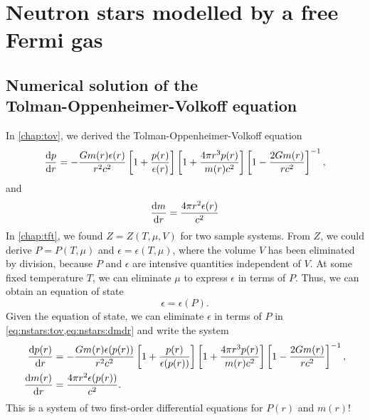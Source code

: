 \chapter{Neutron stars modelled by a free Fermi gas}


\section{Numerical solution of the \texorpdfstring{\\}{}Tolman-Oppenheimer-Volkoff equation}

In \cref{chap:tov}, we derived the Tolman-Oppenheimer-Volkoff equation
\begin{equation}
	\odv{p}{r} = -\frac{G m(r) \epsilon(r)}{r^2 c^2} \left[ 1 + \frac{p(r)}{\epsilon(r)} \right] \left[ 1 + \frac{4 \pi r^3 p(r)}{m(r) c^2} \right] \left[ 1 - \frac{2 G m(r)}{r c^2} \right]^{-1} ,
\label{eq:nstars:tov}
\end{equation}
and
\begin{equation}
	\odv{m}{r} = \frac{4 \pi r^2 \epsilon(r)}{c^2}
\label{eq:nstars:dmdr}
\end{equation}
In \cref{chap:tft}, we found $Z = Z(T, \mu, V)$ for two sample systems.
From $Z$, we could derive $P = P(T, \mu)$ and $\epsilon = \epsilon(T, \mu)$, where the volume $V$ has been eliminated by division, because $P$ and $\epsilon$ are intensive quantities independent of $V$.
At some fixed temperature $T$, we can eliminate $\mu$ to express $\epsilon$ in terms of $P$.
Thus, we can obtain an equation of state
\begin{equation}
	\epsilon = \epsilon(P).
\label{eq:nstars:eos}
\end{equation}
Given the equation of state, we can eliminate $\epsilon$ in terms of $P$ in \cref{eq:nstars:tov,eq:nstars:dmdr} and write the system
\begin{equation}
\begin{split}
	\odv{p(r)}{r} &= -\frac{G m(r) \epsilon(p(r))}{r^2 c^2} \left[ 1 + \frac{p(r)}{\epsilon(p(r))} \right] \left[ 1 + \frac{4 \pi r^3 p(r)}{m(r) c^2} \right] \left[ 1 - \frac{2 G m(r)}{r c^2} \right]^{-1}, \\
	\odv{m(r)}{r} &= \frac{4 \pi r^2 \epsilon(p(r))}{c^2}. \\
\end{split}
\end{equation}
This is a system of two first-order differential equations for $P(r)$ and $m(r)$!
